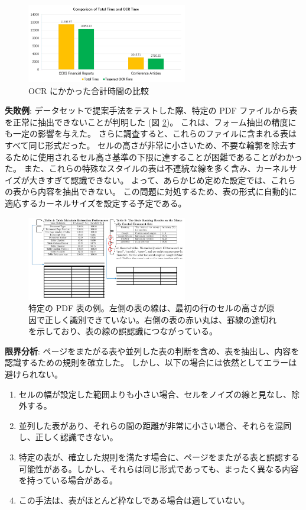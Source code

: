 \documentclass[uplatex, twocolumn,10pt]{jsarticle}
\begin{document}
\begin{figure}[tp]
    \begin{center}
        \includegraphics*[width=7cm]{image/master/master2/Fig6.png}
        \caption{OCR にかかった合計時間の比較}
        \label{fig6}
    \end{center}
\end{figure}

\textbf{失敗例}:
データセットで提案手法をテストした際、特定の PDF ファイルから表を正常に抽出できないことが判明した (図 \ref{fig7})。
これは、フォーム抽出の精度にも一定の影響を与えた。
さらに調査すると、これらのファイルに含まれる表はすべて同じ形式だった。
セルの高さが非常に小さいため、不要な輪郭を除去するために使用されるセル高さ基準の下限に達することが困難であることがわかった。
また、これらの特殊なスタイルの表は不連続な線を多く含み、カーネルサイズが大きすぎて認識できない。
よって、あらかじめ定めた設定では、これらの表から内容を抽出できない。
この問題に対処するため、表の形式に自動的に適応するカーネルサイズを設定する予定である。

\begin{figure}[tp]
    \begin{center}
        \includegraphics*[width=7cm]{image/master/master2/Fig7.png}
        \caption{特定の PDF 表の例。左側の表の線は、最初の行のセルの高さが原因で正しく識別できていない。右側の表の赤い丸は、罫線の途切れを示しており、表の線の誤認識につながっている。}
        \label{fig7}
    \end{center}
\end{figure}

\textbf{限界分析}:
ページをまたがる表や並列した表の判断を含め、表を抽出し、内容を認識するための規則を確立した。
しかし、以下の場合には依然としてエラーは避けられない。

\begin{enumerate}
    \item セルの幅が設定した範囲よりも小さい場合、セルをノイズの線と見なし、除外する。
    \item 並列した表があり、それらの間の距離が非常に小さい場合、それらを混同し、正しく認識できない。
    \item 特定の表が、確立した規則を満たす場合に、ページをまたがる表と誤認する可能性がある。しかし、それらは同じ形式であっても、まったく異なる内容を持っている場合がある。
    \item この手法は、表がほとんど枠なしである場合は適していない。
\end{enumerate}
\end{document}
